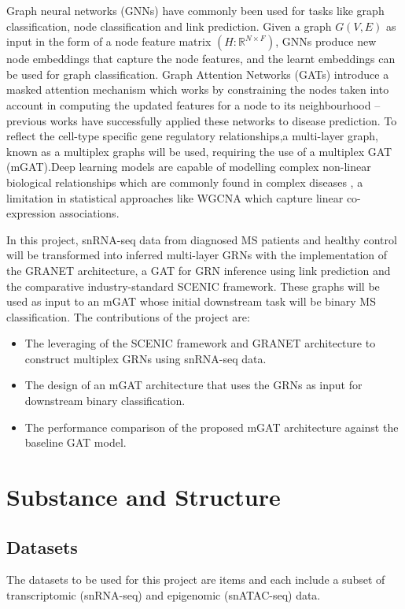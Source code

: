 \documentclass[12pt,a4paper]{report}
\begin{document}
Graph neural networks (GNNs) have commonly been used for tasks like graph classification, node classification and link prediction\parencite{sewellGNNsNetworkClassification2025}. Given a graph $G(V,E)$ as input in the form of a node feature matrix $(H : \mathbb{R}^{N \times F})$, GNNs produce new node embeddings that capture the node features, and
the learnt embeddings can be used for graph classification. Graph Attention Networks (GATs) introduce a masked attention mechanism which works by constraining the nodes taken into account in computing the updated features for a node to its neighbourhood\parencite{velickovicGraphAttentionNetworks2017} -- previous works have
successfully applied these networks to disease prediction\parencite{ravindraDiseaseStatePrediction2020}. To reflect the cell-type specific gene regulatory relationships,a multi-layer graph, known as a multiplex graphs will be used, requiring the use of a multiplex GAT (mGAT).Deep learning models are capable of modelling complex non-linear biological relationships which are commonly found in complex diseases \parencite{avasthiHarnessingGenotypephenotypeNonlinearity2023}, a limitation in statistical approaches like WGCNA which capture linear co-expression associations.

In this project, snRNA-seq data from diagnosed MS patients and healthy control will be transformed into inferred multi-layer GRNs with the implementation of the GRANET architecture\parencite{zhouGRANetGraphResidual2025}, a GAT for GRN inference using link prediction and the comparative industry-standard SCENIC framework. These graphs will be used as input to an mGAT whose initial downstream task will be binary MS classification. The
contributions of the project are:
\begin{itemize}
    \item The leveraging of the SCENIC framework and GRANET architecture to construct  multiplex GRNs using snRNA-seq data. 
    \item  The design of an mGAT architecture that uses the GRNs as input for downstream binary classification.
    \item The performance comparison of the proposed mGAT architecture against the baseline GAT model.
\end{itemize}


\section{Substance and Structure}
\subsection{Datasets}
The datasets to be used for this project are items \cite{zotero-item-47,elkjaerDatasetArticleSingleCell2024,macnairSingleNucleiRNAseq2023,zotero-item-33} and each include a subset of transcriptomic (snRNA-seq) and epigenomic (snATAC-seq) data. 
\end{document}
